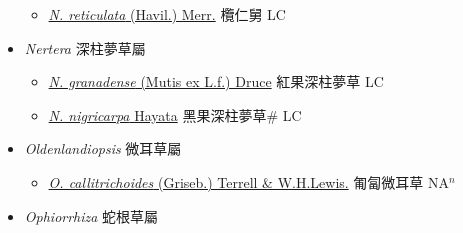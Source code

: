 \begin{itemize}
  \begin{itemize}
        \item[] \href{http://www.theplantlist.org/tpl1.1/search?q=Neonauclea+reticulata}{\textit{N. reticulata} (Havil.) Merr.}   欖仁舅 LC
  \end{itemize}
 \item[] \textit{Nertera} 深柱夢草屬
                    
  \begin{itemize}
        \item[] \href{http://www.theplantlist.org/tpl1.1/search?q=Nertera+granadense}{\textit{N. granadense} (Mutis ex L.f.) Druce}   紅果深柱夢草 LC
        \item[] \href{http://www.theplantlist.org/tpl1.1/search?q=Nertera+nigricarpa}{\textit{N. nigricarpa} Hayata}   黑果深柱夢草\# LC
  \end{itemize}
 \item[] \textit{Oldenlandiopsis} 微耳草屬 
                    
  \begin{itemize}
        \item[] \href{http://www.theplantlist.org/tpl1.1/search?q=Oldenlandiopsis+callitrichoides}{\textit{O. callitrichoides} (Griseb.) Terrell \& W.H.Lewis.}   匍匐微耳草 NA$^n$
  \end{itemize}
 \item[] \textit{Ophiorrhiza} 蛇根草屬
                    

\end{itemize}
